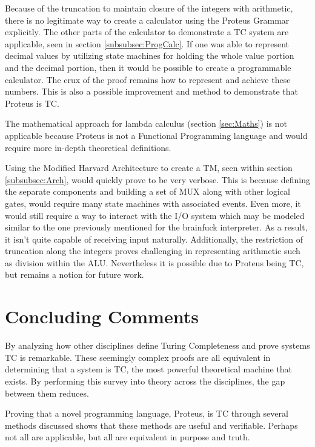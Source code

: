 Because of the truncation to maintain closure of the integers with arithmetic, there is no legitimate way to create a calculator using the Proteus Grammar explicitly.
The other parts of the calculator to demonstrate a TC system are applicable, seen in section \ref{subsubsec:ProgCalc}.
If one was able to represent decimal values by utilizing state machines for holding the whole value portion and the decimal portion, then it would be possible to create a programmable calculator.
The crux of the proof remains how to represent and achieve these numbers.
This is also a possible improvement and method to demonstrate that Proteus is TC.

The mathematical approach for lambda calculus (section \ref{sec:Maths}) is not applicable because Proteus is not a Functional Programming language and would require more in-depth theoretical definitions.

Using the Modified Harvard Architecture to create a TM, seen within section \ref{subsubsec:Arch}, would quickly prove to be very verbose.
This is because defining the separate components and building a set of MUX along with other logical gates, would require many state machines with associated events.
Even more, it would still require a way to interact with the I/O system which may be modeled similar to the one previously mentioned for the brainfuck interpreter.
As a result, it isn't quite capable of receiving input naturally.
Additionally, the restriction of truncation along the integers proves challenging in representing arithmetic such as division within the ALU.
Nevertheless it is possible due to Proteus being TC, but remains a notion for future work.

\section{Concluding Comments}\label{sec:ConclComm}

By analyzing how other disciplines define Turing Completeness and prove systems TC is remarkable.
These seemingly complex proofs are all equivalent in determining that a system is TC, the most powerful theoretical machine that exists.
By performing this survey into theory across the disciplines, the gap between them reduces.

Proving that a novel programming language, Proteus, is TC through several methods discussed shows that these methods are useful and verifiable.
Perhaps not all are applicable, but all are equivalent in purpose and truth.